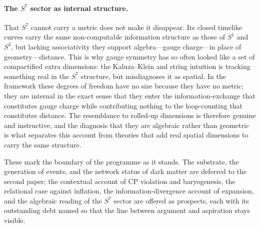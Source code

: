 \paragraph{The $S^{7}$ sector as internal structure.}
That $S^{7}$ cannot carry a metric does not make it disappear. Its closed
timelike curves carry the same non-computable information structure as those of
$S^{1}$ and $S^{3}$, but lacking associativity they support algebra---gauge
charge---in place of geometry---distance. This is why gauge symmetry has so often
looked like a set of compactified extra dimensions: the Kaluza--Klein and string
intuition is tracking something real in the $S^{7}$ structure, but misdiagnoses
it as spatial. In the framework these degrees of freedom have no size because
they have no metric; they are internal in the exact sense that they enter the
information-exchange that constitutes gauge charge while contributing nothing to
the loop-counting that constitutes distance. The resemblance to rolled-up
dimensions is therefore genuine and instructive, and the diagnosis that they are
algebraic rather than geometric is what separates this account from theories that
add real spatial dimensions to carry the same structure.

\medskip
\noindent These mark the boundary of the programme as it stands. The substrate,
the generation of events, and the network status of dark matter are deferred to
the second paper; the contextual account of CP violation and baryogenesis, the
relational case against inflation, the information-divergence account of
expansion, and the algebraic reading of the $S^{7}$ sector are offered as
prospects, each with its outstanding debt named so that the line between argument
and aspiration stays visible.